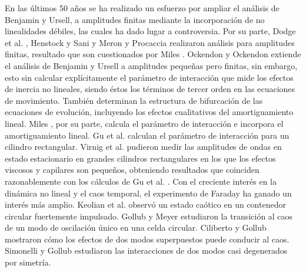 En las últimos 50 años se ha realizado un esfuerzo por ampliar el análisis de Benjamin y Ursell, a amplitudes finitas mediante la incorporación de no linealidades débiles, las cuales ha dado lugar a controversia. Por su parte, Dodge et al. \cite{Dodge1965}, Henstock y Sani \cite{Henstock1974} y Meron y Procaccia \cite{Meron1986} realizaron análisis para amplitudes finitas, resultado que son cuestionados por Miles \cite{Miles1984}. Ockendon y Ockendon \cite{Ockendon1973} extiende el análisis de Benjamin y Ursell a amplitudes pequeñas pero finitas, sin embargo, esto sin calcular explícitamente el parámetro de interacción que mide los efectos de inercia no lineales, siendo éstos los términos de tercer orden en las ecuaciones de movimiento. También determinan la estructura de bifurcación de las ecuaciones de evolución, incluyendo los efectos cualitativos del amortiguamiento lineal. Miles \cite{Miles1984}, por su parte, calcula el parámetro de interacción e incorpora el  amortiguamiento lineal. Gu et al. \cite{Gu1988} calculan el parámetro de interacción para un cilindro rectangular. Virnig et al. \cite{Virnig1988} pudieron medir las amplitudes de ondas en estado estacionario en grandes cilindros rectangulares en los que los efectos viscosos y capilares son pequeños, obteniendo resultados que coinciden razonablemente con los cálculos de Gu et al. \cite{Gu1988}. Con el creciente interés en la dinámica no lineal y el caos temporal, el experimento de Faraday ha ganado un interés más amplio. Keolian et al. \cite{Keolian1981} observó un estado caótico en un contenedor circular fuertemente impulsado.  Gollub y Meyer \cite{Gollub1983} estudiaron la transición al caos de un modo de oscilación único en una celda circular. Ciliberto y Gollub \cite{Ciliberto1984, Ciliberto1985} mostraron cómo los efectos de dos modos superpuestos puede conducir al caos. Simonelli y Gollub \cite{Simonelli1989} estudiaron las interacciones de dos modos casi degenerados por simetría. \medskip %

